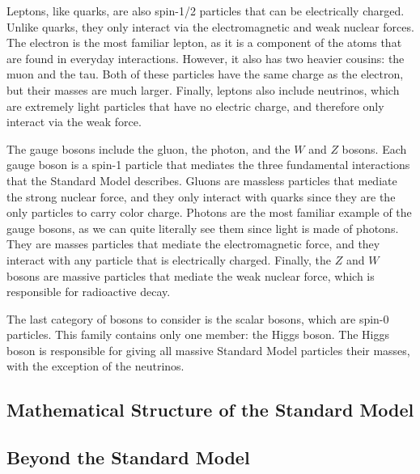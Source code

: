 Leptons, like quarks, are also spin-1/2 particles that can be electrically charged. Unlike quarks, they only interact via the electromagnetic and weak nuclear forces.
The electron is the most familiar lepton, as it is a component of the atoms that are found in everyday interactions.
However, it also has two heavier cousins: the muon and the tau.
Both of these particles have the same charge as the electron, but their masses are much larger.
Finally, leptons also include neutrinos, which are extremely light particles that have no electric charge, and therefore only interact via the weak force.

The gauge bosons include the gluon, the photon, and the $W$ and $Z$ bosons.
Each gauge boson is a spin-1 particle that mediates the three fundamental interactions that the Standard Model describes.
Gluons are massless particles that mediate the strong nuclear force, and they only interact with quarks since they are the only particles to carry color charge.
Photons are the most familiar example of the gauge bosons, as we can quite literally see them since light is made of photons.
They are masses particles that mediate the electromagnetic force, and they interact with any particle that is electrically charged.
Finally, the $Z$ and $W$ bosons are massive particles that mediate the weak nuclear force, which is responsible for radioactive decay.

The last category of bosons to consider is the scalar bosons, which are spin-0 particles.
This family contains only one member: the Higgs boson.
The Higgs boson is responsible for giving all massive Standard Model particles their masses, with the exception of the neutrinos.

\subsection{Mathematical Structure of the Standard Model}

\subsection{Beyond the Standard Model}

